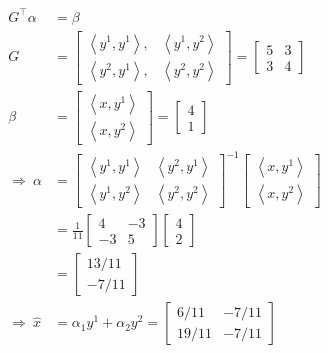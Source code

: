 \documentclass{article}
\theoremstyle{definition} %
\begin{document}
\begin{align*}
    G^{\top} \alpha&=\beta\\
    G&=\left[\begin{array}{ll}
    \left\langle y^{1}, y^{1}\right\rangle, & \left\langle y^{1}, y^2\right\rangle \\
    \left\langle y^2, y^{1}\right\rangle, & \left\langle y^2, y^2\right\rangle
    \end{array}\right]=\left[\begin{array}{ll}
    5 & 3 \\
    3 & 4
    \end{array}\right]\\
    \beta&=\left[\begin{array}{c}
    \left\langle x, y^{1}\right\rangle \\
    \left\langle x, y^2\right\rangle
    \end{array}\right]=\left[\begin{array}{l}
    4 \\
    1
    \end{array}\right]\\
    \Rightarrow \ \alpha&=\left[\begin{array}{cc}
    \left\langle y^{1}, y^{1}\right\rangle & \left\langle y^2, y^{1}\right\rangle \\
    \left\langle y^{1}, y^2\right\rangle & \left\langle y^2, y^2\right\rangle
    \end{array}\right]^{-1}\left[\begin{array}{c}
    \left\langle x, y^{1}\right\rangle \\
    \left\langle x, y^2\right\rangle
    \end{array}\right]\\
    &=\frac{1}{11}\left[\begin{array}{cc}
    4 & -3 \\
    -3 & 5
    \end{array}\right]\left[\begin{array}{l}
    4 \\
    2
    \end{array}\right]\\
    &=
    \begin{bmatrix}
        13/11 \\ -7/11
    \end{bmatrix}\\
    \Rightarrow \ \hat x &= \alpha_1 y^{1}+\alpha_2 y^2 = 
    \begin{bmatrix}
        6/11 & -7/11 \\ 19/11 & -7/11
    \end{bmatrix}
\end{align*}
\end{document}
